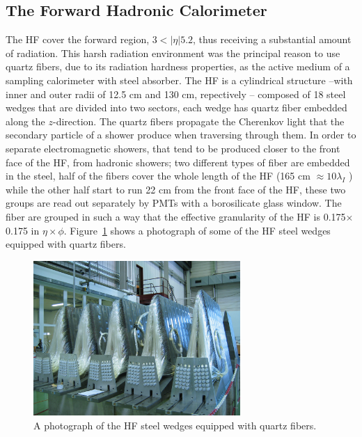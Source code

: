 \subsection{The Forward Hadronic Calorimeter}
The HF cover the forward region, $3 < |\eta| 5.2$, thus receiving a
substantial amount of radiation. This harsh radiation environment was
the principal reason to use quartz fibers, due to its radiation
hardness properties, as the active medium of a
sampling calorimeter with steel absorber. The HF is a cylindrical
structure --with inner and outer radii of 12.5 cm and 130 cm, repectively -- composed of 18
steel wedges that are divided into two sectors, each wedge has quartz
fiber embedded along the $z$-direction. The quartz fibers propagate
the Cherenkov light that the secondary particle of a shower produce
when traversing through them. In order to separate electromagnetic
showers, that tend to be produced closer to the front face of the HF,
from hadronic showers; two different types of fiber are embedded in
the steel, half of the fibers cover the whole length of the HF (165 cm
$\approx 10\lambda_{I}$ ) while the other half start to run 22 cm from
the front face of the HF, these two groups are read out
separately by PMTs with a borosilicate glass window. The fiber are grouped in such a way that the effective
granularity of the HF is 0.175$\times$0.175 in
$\eta\times\phi$. Figure~\ref{fig:HF_photo} shows a photograph of some
of the HF steel wedges equipped with quartz fibers.
\begin{figure}
 \centering
\includegraphics[width=0.7\textwidth]{CMS_DetectorFigures/HF_cal.jpg}
\caption{A photograph of the HF steel wedges equipped with quartz fibers.\label{fig:HF_photo}}
\end{figure}

